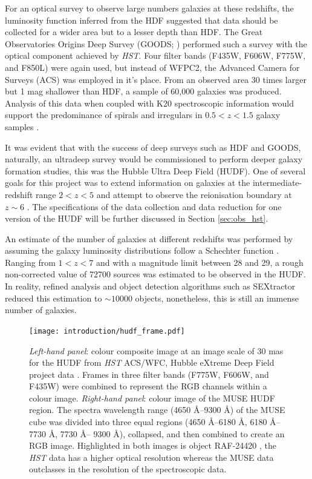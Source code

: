 \documentclass[12pt, twocolumn, nofootinbib]{revtex4-1}    %
\begin{document}
For an optical survey to observe large numbers galaxies at these redshifts, the luminosity function inferred from the HDF suggested that data should be collected for a wider area but to a lesser depth than HDF. The Great Observatories Origins Deep Survey (GOODS; \citealt{2004ApJ...600L..93G}) performed such a survey with the optical component achieved by \textit{HST}. Four filter bands (F435W, F606W, F775W, and F850L) were again used, but instead of WFPC2, the Advanced Camera for Surveys (ACS) was employed in it's place. From an observed area 30 times larger but 1 mag shallower than HDF, a sample of 60,000 galaxies was produced. Analysis of this data when coupled with K20 spectroscopic information would support the predominance of spirals and irregulars in $0.5<z<1.5$ galaxy samples \citep{2005MNRAS.357..903C}.

It was evident that with the success of deep surveys such as HDF and GOODS, naturally, an ultradeep survey would be commissioned to perform deeper galaxy formation studies, this was the Hubble Ultra Deep Field (HUDF). One of several goals for this project was to extend information on galaxies at the intermediate-redshift range $2<z<5$ and attempt to observe the reionisation boundary at $z\sim6$ \citep{2006AJ....132.1729B}. The specifications of the data collection and data reduction for one version of the HUDF will be further discussed in Section \ref{sec:obs_hst}.

An estimate of the number of galaxies at different redshifts was performed by assuming the galaxy luminosity distributions follow a Schechter function \citep{1976ApJ...203..297S}. Ranging from $1<z<7$ and with a magnitude limit between 28 and 29, a rough non-corrected value of 72700 sources was estimated to be observed in the HUDF. In reality, refined analysis and object detection algorithms such as SEXtractor \citep{1996A&AS..117..393B} reduced this estimation to $\sim10000$ objects, nonetheless, this is still an immense number of galaxies. 

\begin{figure}
\texttt{[image: introduction/hudf\_frame.pdf]}
\caption[Hubble Ultra Deep Field]{\textit{Left-hand panel}: colour composite image at an image scale of 30 mas for the HUDF from \textit{HST} ACS/WFC, Hubble eXtreme Deep Field project data \citep{2013ApJS..209....6I}. Frames in three filter bands (F775W, F606W, and F435W) were combined to represent the RGB channels within a colour image. \textit{Right-hand panel}: colour image of the MUSE HUDF region. The spectra wavelength range (4650 \AA--9300 \AA) of the MUSE cube was divided into three equal regions (4650 \AA--6180 \AA, 6180 \AA--7730 \AA, 7730 \AA -- 9300 \AA), collapsed, and then combined to create an RGB image. Highlighted in both images is object RAF-24420 \citep{2015AJ....150...31R}, the \textit{HST} data has a higher optical resolution whereas the MUSE data outclasses in the resolution of the spectroscopic data.}
\label{fig:hst_muse_hdf}
\end{figure}
\end{document}
